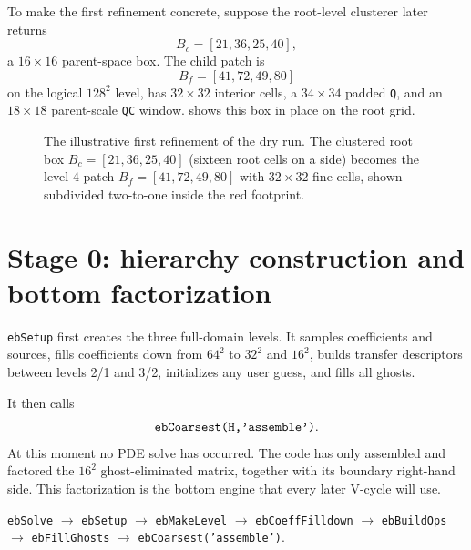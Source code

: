 \documentclass[11pt,oneside,openany]{book}
\newcommand{\code}[1]{\textnormal{\texttt{#1}}}
\begin{document}
To make the first refinement concrete, suppose the root-level clusterer later returns
\[
 B_c=[21,36,25,40],
\]
a $16\times16$ parent-space box. The child patch is
\[
 B_f=[41,72,49,80]
\]
on the logical $128^2$ level, has $32\times32$ interior cells, a $34\times34$ padded \code{Q}, and an $18\times18$ parent-scale \code{QC} window.  shows this box in place on the root grid.

\begin{figure}[htbp]
\centering
{}
\caption{The illustrative first refinement of the dry run. The clustered root box $B_c=[21,36,25,40]$ (sixteen root cells on a side) becomes the level-4 patch $B_f=[41,72,49,80]$ with $32\times32$ fine cells, shown subdivided two-to-one inside the red footprint.}
\label{fig:dryrunbox}
\end{figure}

\section{Stage 0: hierarchy construction and bottom factorization}
\code{ebSetup} first creates the three full-domain levels. It samples coefficients and sources, fills coefficients down from $64^2$ to $32^2$ and $16^2$, builds transfer descriptors between levels 2/1 and 3/2, initializes any user guess, and fills all ghosts.

It then calls
\[
  \code{ebCoarsest(H,'assemble')}.
\]
At this moment no PDE solve has occurred. The code has only assembled and factored the $16^2$ ghost-eliminated matrix, together with its boundary right-hand side. This factorization is the bottom engine that every later V-cycle will use.

\begin{codepath}
\code{ebSolve} $\to$ \code{ebSetup} $\to$ \code{ebMakeLevel} $\to$ \code{ebCoeffFilldown} $\to$ \code{ebBuildOps} $\to$ \code{ebFillGhosts} $\to$ \code{ebCoarsest('assemble')}.
\end{codepath}
\end{document}
